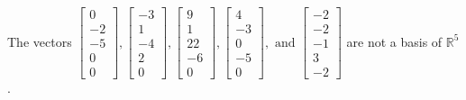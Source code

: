 \begin{exercise}
\begin{exerciseStatement}
  \end{exerciseStatement}
  \begin{exerciseAnswer}
   The vectors \(\left[\begin{array}{r}
0 \\
-2 \\
-5 \\
0 \\
0
\end{array}\right] , \left[\begin{array}{r}
-3 \\
1 \\
-4 \\
2 \\
0
\end{array}\right] , \left[\begin{array}{r}
9 \\
1 \\
22 \\
-6 \\
0
\end{array}\right] , \left[\begin{array}{r}
4 \\
-3 \\
0 \\
-5 \\
0
\end{array}\right] , \text{ and } \left[\begin{array}{r}
-2 \\
-2 \\
-1 \\
3 \\
-2
\end{array}\right]\) 
  	 are not  a basis of \(\mathbb{R}^5\).
  


  \end{exerciseAnswer}
\end{exercise}